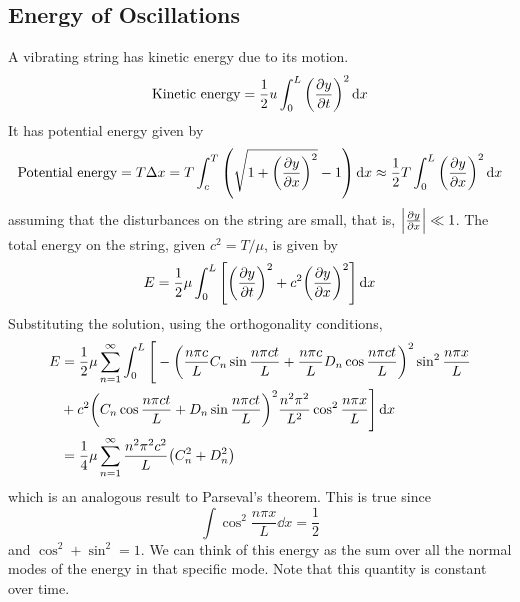\subsection{Energy of Oscillations}
A vibrating string has kinetic energy due to its motion.
\[ \text{Kinetic energy} = \frac{1}{2}u \int_0^L \qty(\pdv{y}{t})^2 \dd{x} \]
It has potential energy given by
\[ \text{Potential energy} = T \Delta x = T \int_c^T \qty(\sqrt{1 + \qty(\pdv{y}{x})^2}-1)\dd{x} \approx \frac{1}{2} T \int_0^L \qty(\pdv{y}{x})^2 \dd{x} \]
assuming that the disturbances on the string are small, that is, \( \abs{\pdv{y}{x}} \ll 1 \).
The total energy on the string, given \( c^2 = T/\mu \), is given by
\[ E = \frac{1}{2}\mu \int_0^L \qty[\qty(\pdv{y}{t})^2 + c^2 \qty(\pdv{y}{x})^2] \dd{x} \]
Substituting the solution, using the orthogonality conditions,
\begin{align*}
    E &= \frac{1}{2}\mu \sum_{n=1}^\infty \int_0^L \Bigg[-\qty(\frac{n \pi c}{L} C_n \sin \frac{n \pi c t}{L} + \frac{n \pi c}{L} D_n \cos \frac{n \pi c t}{L})^2 \sin^2 \frac{n \pi x}{L} \\
    &+ c^2 \qty(C_n \cos \frac{n \pi c t}{L} + D_n \sin \frac{n \pi c t}{L})^2 \frac{n^2 \pi^2}{L^2} \cos^2 \frac{n \pi x}{L} \Bigg] \dd{x} \\
    &= \frac{1}{4} \mu \sum_{n=1}^\infty \frac{n^2 \pi^2 c^2}{L} \qty(C_n^2 + D_n^2)
\end{align*}
which is an analogous result to Parseval's theorem.
This is true since \[ \int \cos^2 \frac{n \pi x}{L}\dd{x} = \frac{1}{2} \] and \( \cos^2 + \sin^2 = 1 \).
We can think of this energy as the sum over all the normal modes of the energy in that specific mode.
Note that this quantity is constant over time.

